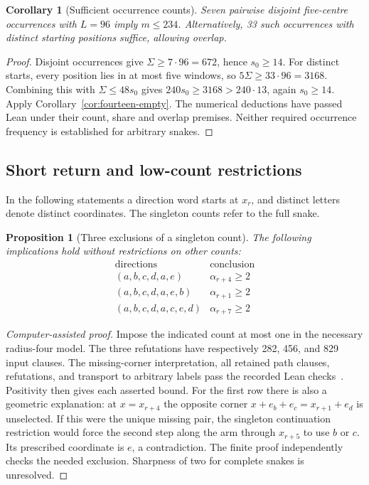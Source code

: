 \documentclass[11pt,a4paper]{article}
\newtheorem{proposition}[theorem]{Proposition}
\newtheorem{corollary}[theorem]{Corollary}
\theoremstyle{definition}
\theoremstyle{remark}
\begin{document}
\begin{corollary}[Sufficient occurrence counts]\label{cor:share-occurrences-234}
Seven pairwise disjoint five-centre occurrences with $L=96$ imply $m\le234$. Alternatively, 33 such occurrences with distinct starting positions suffice, allowing overlap.
\end{corollary}
\begin{proof}
Disjoint occurrences give $\Sigma\ge7\cdot96=672$, hence $s_0\ge14$.
For distinct starts, every position lies in at most five windows, so
$5\Sigma\ge33\cdot96=3168$. Combining this with $\Sigma\le48s_0$
gives $240s_0\ge3168>240\cdot13$, again $s_0\ge14$.
Apply Corollary~\ref{cor:fourteen-empty}. The numerical deductions have
passed Lean under their count, share and overlap premises. Neither
required occurrence frequency is established for arbitrary snakes.
\end{proof}

\subsection{Short return and low-count restrictions}\label{sec:short-returns}
In the following statements a direction word starts at $x_r$, and distinct letters denote distinct coordinates. The singleton counts refer to the full snake.

\begin{proposition}[Three exclusions of a singleton count]\label{prop:three-singleton-exclusions}
The following implications hold without restrictions on other counts:
\[
\begin{array}{c|c}
\text{directions}&\text{conclusion}\\\hline
(a,b,c,d,a,e)&\alpha_{r+4}\ge2\\
(a,b,c,d,a,e,b)&\alpha_{r+1}\ge2\\
(a,b,c,d,a,c,e,d)&\alpha_{r+7}\ge2
\end{array}
\]
\end{proposition}
\begin{proof}[Computer-assisted proof]
Impose the indicated count at most one in the necessary radius-four model. The three refutations have respectively 282, 456, and 829 input clauses. The missing-corner interpretation, all retained path clauses, refutations, and transport to arbitrary labels pass the recorded Lean checks~\cite{recentarchive}. Positivity then gives each asserted bound. For the first row there is also a geometric explanation: at $x=x_{r+4}$ the opposite corner $x+e_b+e_c=x_{r+1}+e_d$ is unselected. If this were the unique missing pair, the singleton continuation restriction would force the second step along the arm through $x_{r+5}$ to use $b$ or $c$. Its prescribed coordinate is $e$, a contradiction. The finite proof independently checks the needed exclusion. Sharpness of two for complete snakes is unresolved.
\end{proof}
\end{document}
